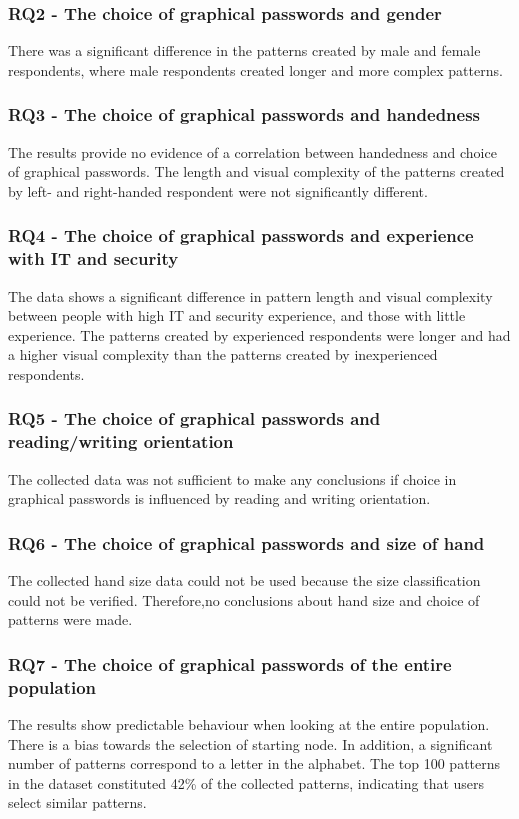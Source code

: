 \subsubsection*{RQ2 - The choice of graphical passwords and gender}
There was a significant difference in the patterns created by male and female respondents, where male respondents created longer and more complex patterns. 

\subsubsection*{RQ3 - The choice of graphical passwords and handedness}
The results provide no evidence of a correlation between handedness and choice of graphical passwords. The length and visual complexity of the patterns created by left- and right-handed respondent were not significantly different. 

\subsubsection*{RQ4 - The choice of graphical passwords and experience with IT and security}
The data shows a significant difference in pattern length and visual complexity between people with high IT and security experience, and those with little experience. The patterns created by experienced respondents were longer and had a higher visual complexity than the patterns created by inexperienced respondents.

\subsubsection*{RQ5 - The choice of graphical passwords and reading/writing orientation}
The collected data was not sufficient to make any conclusions if choice in graphical passwords is influenced by reading and writing orientation.

\subsubsection*{RQ6 - The choice of graphical passwords and size of hand}
The collected hand size data could not be used because the size classification could not be verified. Therefore,no conclusions about hand size and choice of patterns were made.

\subsubsection*{RQ7 - The choice of graphical passwords of the entire population}
The results show predictable behaviour when looking at the entire population. There is a bias towards the selection of starting node. In addition, a significant number of patterns correspond to a letter in the alphabet. The top 100 patterns in the dataset constituted 42\% of the collected patterns, indicating that users select similar patterns. 


